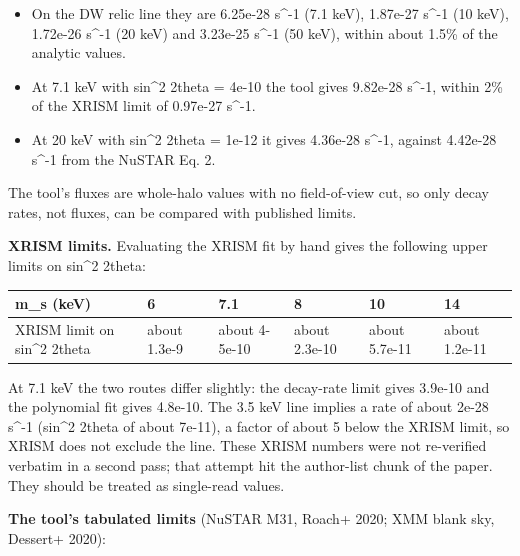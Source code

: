 \documentclass[11pt,a4paper]{article}
\begin{document}
\begin{itemize}
  \item On the DW relic line they are 6.25e-28 s\textasciicircum{}-1 (7.1 keV), 1.87e-27 s\textasciicircum{}-1 (10 keV), 1.72e-26 s\textasciicircum{}-1 (20 keV) and 3.23e-25 s\textasciicircum{}-1 (50 keV), within about 1.5\% of the analytic values.
  \item At 7.1 keV with sin\textasciicircum{}2 2theta = 4e-10 the tool gives 9.82e-28 s\textasciicircum{}-1, within 2\% of the XRISM limit of 0.97e-27 s\textasciicircum{}-1.
  \item At 20 keV with sin\textasciicircum{}2 2theta = 1e-12 it gives 4.36e-28 s\textasciicircum{}-1, against 4.42e-28 s\textasciicircum{}-1 from the NuSTAR Eq. 2.
\end{itemize}
The tool's fluxes are whole-halo values with no field-of-view cut, so only decay rates, not fluxes, can be compared with published limits.

\textbf{XRISM limits.} Evaluating the XRISM fit by hand gives the following upper limits on sin\textasciicircum{}2 2theta:

\begin{longtable}{@{}p{}p{}p{}p{}p{}p{}@{}}
\toprule
\textbf{m\_s (keV)} & \textbf{6} & \textbf{7.1} & \textbf{8} & \textbf{10} & \textbf{14} \\ \midrule \endhead
XRISM limit on sin\textasciicircum{}2 2theta & about 1.3e-9 & about 4-5e-10 & about 2.3e-10 & about 5.7e-11 & about 1.2e-11 \\
\bottomrule\end{longtable}
At 7.1 keV the two routes differ slightly: the decay-rate limit gives 3.9e-10 and the polynomial fit gives 4.8e-10. The 3.5 keV line implies a rate of about 2e-28 s\textasciicircum{}-1 (sin\textasciicircum{}2 2theta of about 7e-11), a factor of about 5 below the XRISM limit, so XRISM does not exclude the line. These XRISM numbers were not re-verified verbatim in a second pass; that attempt hit the author-list chunk of the paper. They should be treated as single-read values.

\textbf{The tool's tabulated limits} (NuSTAR M31, Roach+ 2020; XMM blank sky, Dessert+ 2020):
\end{document}
